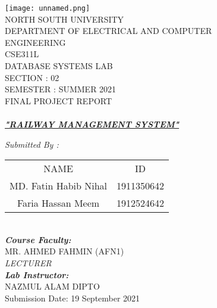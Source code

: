 \documentclass{article}
\begin{document}
\begin{figure}
\centering
\texttt{[image: unnamed.png]}\\ \vspace{0.1in}
\vspace{0.1in}
{\large NORTH SOUTH UNIVERSITY \\
\small DEPARTMENT OF ELECTRICAL AND COMPUTER ENGINEERING }\\

{CSE311L \\ DATABASE SYSTEMS LAB \\ SECTION : 02} \\ 
\vspace{0.1in}
{\small SEMESTER : SUMMER 2021}\\
\vspace{0.15in}
{\large FINAL PROJECT REPORT}\\ \vspace{0.09in}{OF}\\ 
\vspace{0.1in}
{\large{\textbf{\emph{\underline{"RAILWAY MANAGEMENT SYSTEM"}}}}}
\begin{center}
{\emph{Submitted By :}}\\ 
\vspace{0.1in}
\begin{tabular}{c c}
\vspace{0.1in}
NAME & ID\\ 
\large MD. Fatin Habib Nihal   & 1911350642\\ 
\large Faria Hassan Meem       & 1912524642
\end{tabular}\\
\vspace{0.25in}
{\textbf{\emph{\large Course Faculty:}}}\\
{MR. AHMED FAHMIN (AFN1)}\\
{\emph{LECTURER}}\\ 
\vspace{0.2in}
{\textbf{\emph{Lab Instructor:}}}\\
{NAZMUL ALAM DIPTO}\\
\vspace{0.5in}
\large{Submission Date: 19 September 2021}
\end{center}
\end{figure}
\clearpage


\tableofcontents

\newpage
\end{document}
